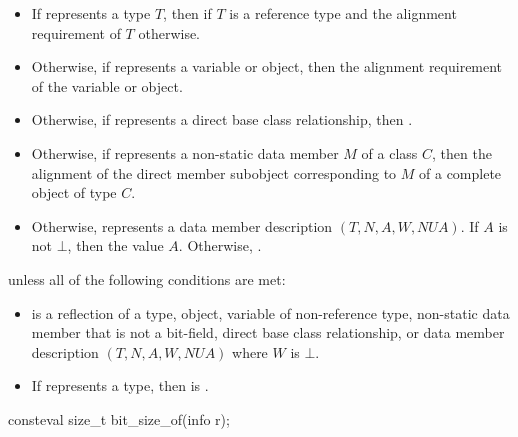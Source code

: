 \begin{itemdescr}
\pnum
\returns
\begin{itemize}
\item
  If  represents a type $T$,
  then  if $T$ is a reference type
  and the alignment requirement of $T$ otherwise.
\item
  Otherwise, if  represents a variable or object,
  then the alignment requirement of the variable or object.
\item
  Otherwise, if  represents a direct base class relationship,
  then .
\item
  Otherwise, if  represents a non-static data member $M$ of a class $C$,
  then the alignment of the direct member subobject
  corresponding to $M$ of a complete object of type $C$.
\item
  Otherwise,  represents a data member description
  $(T, N, A, W, \mathit{NUA})$.
  If $A$ is not $\bot$,
  then the value $A$.
  Otherwise, .
\end{itemize}

\pnum
\throws
{} unless
all of the following conditions are met:
\begin{itemize}
\item
{} is a reflection of a
type,
object,
variable of non-reference type,
non-static data member that is not a bit-field,
direct base class relationship, or
data member description
$(T, N, A, W, \mathit{NUA})$
where $W$ is $\bot$.
\item
If  represents a type,
then  is .
\end{itemize}
\end{itemdescr}

%
\begin{itemdecl}
consteval size_t bit_size_of(info r);
\end{itemdecl}

